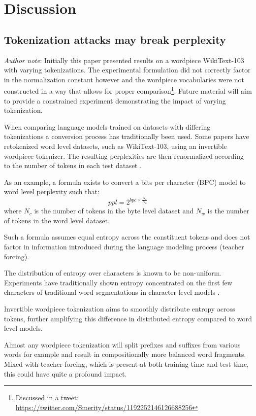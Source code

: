 \documentclass{article}
\begin{document}
\section{Discussion}

\subsection{Tokenization attacks may break perplexity} 

\textit{Author note}: Initially this paper presented results on a wordpiece WikiText-103 with varying tokenizations.
The experimental formulation did not correctly factor in the normalization constant however and the wordpiece vocabularies were not constructed in a way that allows for proper comparison\footnote{Discussed in a tweet: \url{https://twitter.com/Smerity/status/1192252146126688256}}.
Future material will aim to provide a constrained experiment demonstrating the impact of varying tokenization.


When comparing language models trained on datasets with differing tokenizations a conversion process has traditionally been used.
Some papers have retokenized word level datasets, such as WikiText-103, using an invertible wordpiece tokenizer.
The resulting perplexities are then renormalized according to the number of tokens in each test dataset \cite{mikolov2012subword, hwang2017character}.

As an example, a formula exists to convert a bits per character (BPC) model to word level perplexity such that:
$$ppl = 2 ^{bpc \times \frac{N_c}{N_w}}$$
where $N_c$ is the number of tokens in the byte level dataset and $N_w$ is the number of tokens in the word level dataset.

Such a formula assumes equal entropy across the constituent tokens and does not factor in information introduced during the language modeling process (teacher forcing).

The distribution of entropy over characters is known to be non-uniform.
Experiments have traditionally shown entropy concentrated on the first few characters of traditional word segmentations in character level models \cite{elman1990finding}.

Invertible wordpiece tokenization aims to smoothly distribute entropy across tokens, further amplifying this difference in distributed entropy compared to word level models.






Almost any wordpiece tokenization will split prefixes and suffixes from various words for example and result in compositionally more balanced word fragments.
Mixed with teacher forcing, which is present at both training time and test time, this could have quite a profound impact.
\end{document}
